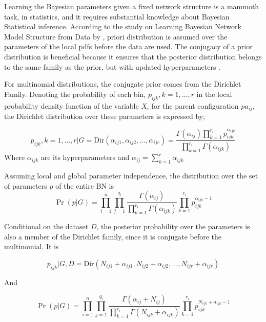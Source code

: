 Learning the Bayesian parameters given a fixed network structure is a mammoth task, in statistics, and it requires substantial knowledge about Bayesian Statistical inference. According to the study on Learning Bayesian Network Model Structure from Data by \textcite{Margaritis2003}, priori distribution is assumed over the parameters of the local pdfs before the data are used. The conjugacy of a prior distribution is beneficial because it ensures that the posterior distribution belongs to the same family as the prior, but with updated hyperparameters \parencite{Dearden2013}. 

For multinomial distributions, the conjugate prior comes from the Dirichlet Family. Denoting the probability of each bin, \( p_{ijk}, k=1,\dots,r \) in the local probability density function of the variable \( X_i \) for the parent configuration \( pa_{ij} \), the Dirichlet distribution over these parameters is expressed by;

\begin{equation}
p_{ijk}, k=1,\dots,r | G = \text{Dir}(\alpha_{ij1}, \alpha_{ij2}, \dots, \alpha_{ijr}) = \frac{\Gamma(\alpha_{ij}) \prod_{k=1}^{r_i} p_{ijk}^{\alpha_{ijk}}}{\prod_{k=1}^{r_i} \Gamma(\alpha_{ijk})}
\end{equation}
Where \( \alpha_{ijk} \) are its hyperparameters and \( \alpha_{ij} = \sum_{k=1}^{r} \alpha_{ijk} \)

Assuming local and global parameter independence, the distribution over the set of parameters \( p \) of the entire BN is 
\begin{equation}
\Pr(p | G) = \prod_{i=1}^n \prod_{j=1}^{q_i} \frac{\Gamma(\alpha_{ij})}{\prod_{k=1}^{r_i} \Gamma(\alpha_{ijk})} \prod_{k=1}^{r_i} p_{ijk}^{\alpha_{ijk} - 1} 
\end{equation}

Conditional on the dataset \( D \), the posterior probability over the parameters is also a member of the Dirichlet family, since it is conjugate before the multinomial. It is

\begin{equation}
p_{ijk} | G,D = \text{Dir}(N_{ij1} + \alpha_{ij1}, N_{ij2} + \alpha_{ij2}, \dots, N_{ijr} + \alpha_{ijr})
\end{equation}

And 

\begin{equation}
\Pr(p | G) = \prod_{i=1}^n \prod_{j=1}^{q_i} \frac{\Gamma(\alpha_{ij} + N_{ij})}{\prod_{k=1}^{r_i} \Gamma(N_{ijk} + \alpha_{ijk})} \prod_{k=1}^{r_i} p_{ijk}^{N_{ijk} + \alpha_{ijk} - 1}
\end{equation}

